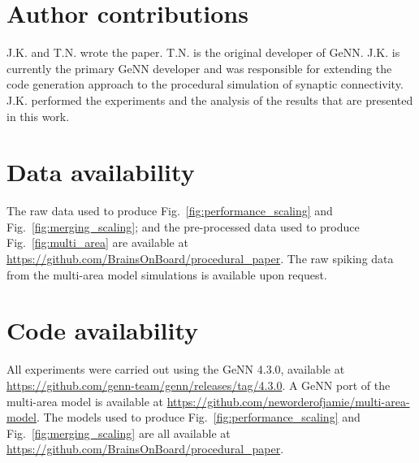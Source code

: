 \documentclass[9pt,a4paper]{amsart}
\begin{document}
\section{Author contributions}
J.K. and T.N. wrote the paper.
T.N. is the original developer of GeNN.
J.K. is currently the primary GeNN developer and was responsible for extending the code generation approach to the procedural simulation of synaptic connectivity.
J.K. performed the experiments and the analysis of the results that are presented in this work.

\section{Data availability}
The raw data used to produce Fig.~\ref{fig:performance_scaling} and Fig.~\ref{fig:merging_scaling}; and the pre-processed data used to produce Fig.~\ref{fig:multi_area} are available at \url{https://github.com/BrainsOnBoard/procedural_paper}.
The raw spiking data from the multi-area model simulations is available upon request.

\section{Code availability}
All experiments were carried out using the GeNN 4.3.0, available at \url{https://github.com/genn-team/genn/releases/tag/4.3.0}.
A GeNN port of the multi-area model is available at \url{https://github.com/neworderofjamie/multi-area-model}.
The models used to produce Fig.~\ref{fig:performance_scaling} and Fig.~\ref{fig:merging_scaling} are all available at \url{https://github.com/BrainsOnBoard/procedural_paper}.



\end{document}
